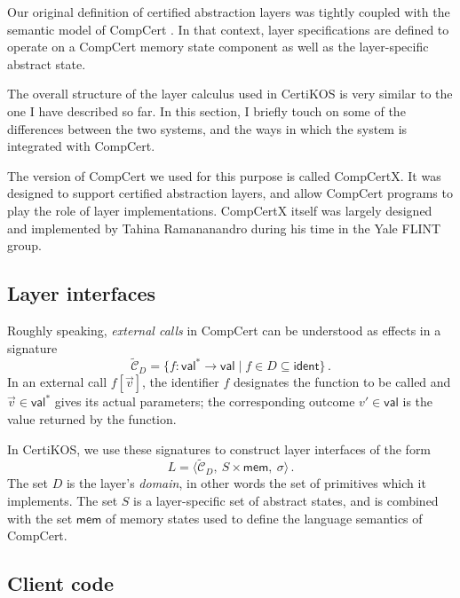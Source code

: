 \documentclass[11pt,oneside]{book}
\theoremstyle{definition}
\newcommand{\kw}[1]{\ensuremath{ \mathsf{#1} }}
\begin{document}
Our original definition of certified abstraction layers
was tightly coupled with the semantic model of CompCert
\citep{popl15}.
In that context,
layer specifications are defined to operate
on a CompCert memory state component as well as
the layer-specific abstract state.

The overall structure of
the layer calculus used in CertiKOS is very similar
to the one I have described so far.
In this section,
I briefly touch on some of the differences between the two systems,
and the ways in which the system is integrated with CompCert.

The version of CompCert we used for this purpose
is called CompCertX.
It was designed to support certified abstraction layers,
and allow CompCert programs
to play the role of layer implementations.
CompCertX itself was largely designed and implemented
by Tahina Ramananandro
during his time in the Yale FLINT group.

\subsection{Layer interfaces} %

Roughly speaking,
\emph{external calls} in CompCert
can be understood as effects in a signature
\[
  \tilde{\mathcal{C}}_D =
  \{ f : \kw{val}^* \rightarrow \kw{val} \mid
    f \in D \subseteq \kw{ident} \}
  \,.
\]
In an external call $f[\vec{v}]$,
the identifier $f$ designates the function to be called
and $\vec{v} \in \kw{val}^*$ gives its actual parameters;
the corresponding outcome $v' \in \kw{val}$
is the value returned by the function.

In CertiKOS,
we use these signatures
to construct layer interfaces of the form
\[
  L =
  \langle \tilde{\mathcal{C}}_D, \: S \times \kw{mem}, \: \sigma \rangle
  \,.
\]
The set $D$ is the layer's \emph{domain},
in other words the set of primitives which it implements.
The set $S$ is a layer-specific set of abstract states,
and is combined with the set $\kw{mem}$ of memory states
used to define the language semantics of CompCert.


\subsection{Client code} %
\end{document}
